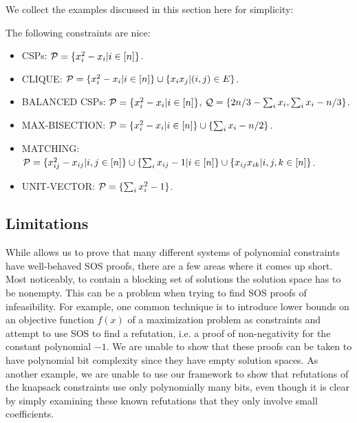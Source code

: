 We collect the examples discussed in this section here for simplicity:
\begin{theorem}\label{thm:examples}
The following constraints are nice:
\begin{itemize}
\item CSPs: $\mathcal P = \{x_i^2 - x_i | i \in [n]\}$. 
\item CLIQUE: $\mathcal P = \{x_i^2 - x_i | i \in [n]\} \cup \{x_ix_j | (i,j) \in E\}$.
\item BALANCED CSPs: $\mathcal P = \{x_i^2 - x_i | i \in [n]\}$, $\mathcal Q = \{2n/3 - \sum_i x_i, \sum_i x_i - n/3\}$.
\item MAX-BISECTION: $\mathcal P = \{x_i^2 - x_i | i \in [n]\} \cup \{\sum_i x_i - n/2\}$.
\item MATCHING: $\mathcal P = \{x_{ij}^2 - x_{ij} | i,j \in [n]\} \cup \{\sum_i x_{ij} - 1 | i \in [n]\} \cup \{x_{ij}x_{ik} | i,j,k \in [n]\}$.
\item UNIT-VECTOR: $\mathcal P = \{\sum_i x_i^2 - 1\}$.
\end{itemize}
\end{theorem}

\subsection{Limitations}
While  allows us to prove that many different systems of polynomial constraints have well-behaved SOS proofs, there are a few areas where it comes up short. Most noticeably, to contain a blocking set of solutions the solution space has to be nonempty. This can be a problem when trying to find SOS proofs of infeasibility. For example, one common technique is to introduce lower bounds on an objective function $f(x)$ of a maximization problem as constraints and attempt to use SOS to find a refutation, i.e. a proof of non-negativity for the constant polynomial $-1$. We are unable to show that these proofs can be taken to have polynomial bit complexity since they have empty solution spaces. As another example, we are unable to use our framework to show that refutations of the knapsack constraints use only polynomially many bits, even though it is clear by simply examining these known refutations that they only involve small coefficients. 